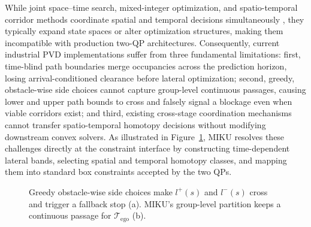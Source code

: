 While joint space--time search, mixed-integer optimization, and spatio-temporal corridor methods coordinate spatial and temporal decisions simultaneously \citep{mcnaughton2011lattice,kessler2023,yoon2024stcorridor}, they typically expand state spaces or alter optimization structures, making them incompatible with production two-QP architectures. Consequently, current industrial PVD implementations suffer from three fundamental limitations:
first, time-blind path boundaries merge occupancies across the prediction horizon, losing arrival-conditioned clearance before lateral optimization;
second, greedy, obstacle-wise side choices cannot capture group-level continuous passages, causing lower and upper path bounds to cross and falsely signal a blockage even when viable corridors exist;
and third, existing cross-stage coordination mechanisms cannot transfer spatio-temporal homotopy decisions without modifying downstream convex solvers.
As illustrated in Figure~\ref{fig:teaser_en}, MIKU resolves these challenges directly at the constraint interface by constructing time-dependent lateral bands, selecting spatial and temporal homotopy classes, and mapping them into standard box constraints accepted by the two QPs.

\begin{figure}
\centering
{}
\caption{Greedy obstacle-wise side choices make $l^+(s)$ and $l^-(s)$ cross and trigger a fallback stop (a). MIKU's group-level partition keeps a continuous passage for $\mathcal{T}_{\mathrm{ego}}$ (b).}
\label{fig:teaser_en}
\end{figure}

